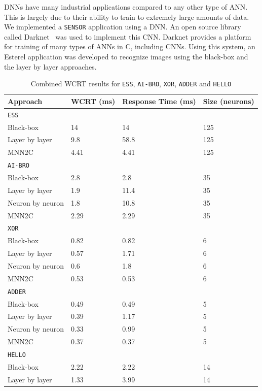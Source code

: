 \acp{DNN} have many industrial applications compared to any other type
of \ac{ANN}. This is largely due to their ability to train to
extremely large amounts of data. We implemented a \texttt{SENSOR}
application using a \ac{DNN}. An open source library called Darknet~\cite{redmon2015real} was used
to implement this \ac{CNN}. Darknet provides a platform for training
of many types of \acp{ANN} in C, including \acp{CNN}. 
Using this system, an Esterel application was developed to recognize images using the black-box and the layer by layer approaches.%

\begin{table}[H]
	\centering
	\caption{Combined \ac{WCRT} results for \texttt{ESS}, \texttt{AI-BRO}, \texttt{XOR}, \texttt{ADDER} and \texttt{HELLO}}
	\label{tbl:res-sann}
	\begin{tabular}{|l|l|l|l|}
		\hline
		Approach         & WCRT (ms) & Response Time (ms) & Size (neurons) \\ \hline
		\multicolumn{4}{|l|}{\texttt{ESS}} \\ \hline
		Black-box        & 14  & 14 & 125 \\ 
		Layer by layer   & 9.8  & 58.8 & 125 \\
		MNN2C			 & 4.41 & 4.41 & 125 \\ \hline
		\multicolumn{4}{|l|}{\texttt{AI-BRO}}  \\ \hline
		Black-box        & 2.8  & 2.8 & 35 \\ 
		Layer by layer   & 1.9  & 11.4 & 35 \\ 
		Neuron by neuron & 1.8  & 10.8 & 35 \\ 
		MNN2C			 & 2.29 & 2.29 & 35 \\ \hline
		\multicolumn{4}{|l|}{\texttt{XOR}}  \\ \hline
		Black-box        & 0.82 & 0.82 & 6  \\ 
		Layer by layer   & 0.57 & 1.71 & 6 \\ 
		Neuron by neuron & 0.6  & 1.8 & 6 \\ 
		MNN2C			 & 0.53 & 0.53 & 6 \\ \hline
		\multicolumn{4}{|l|}{\texttt{ADDER}}  \\ \hline
		Black-box        & 0.49 & 0.49 & 5  \\ 
		Layer by layer   & 0.39 & 1.17 & 5 \\ 
		Neuron by neuron & 0.33 & 0.99 & 5 \\ 
		MNN2C			 & 0.37 & 0.37 & 5 \\ \hline
		\multicolumn{4}{|l|}{\texttt{HELLO}}  \\ \hline
		Black-box        & 2.22  & 2.22 & 14 \\ 
		Layer by layer   & 1.33  & 3.99 & 14 \\ \hline
	\end{tabular}
\end{table}

